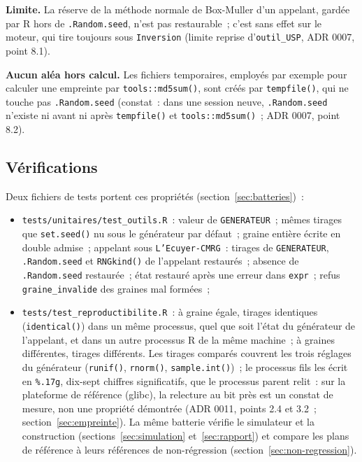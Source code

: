 \documentclass[a4paper,11pt]{article}
\newcommand{\code}[1]{\texttt{\small #1}}
\begin{document}
\medskip
\textbf{Limite.} La réserve de la méthode normale de Box-Muller d'un appelant,
gardée par R hors de \code{.Random.seed}, n'est pas restaurable~; c'est sans
effet sur le moteur, qui tire toujours sous \code{Inversion} (limite reprise
d'\code{outil\_USP}, ADR 0007, point 8.1).

\medskip
\textbf{Aucun aléa hors calcul.} Les fichiers temporaires, employés par
exemple pour calculer une empreinte par \code{tools::md5sum()}, sont créés par
\code{tempfile()}, qui ne touche pas \code{.Random.seed} (constat~: dans une
session neuve, \code{.Random.seed} n'existe ni avant ni après \code{tempfile()}
et \code{tools::md5sum()}~; ADR 0007, point 8.2).

\subsection{Vérifications}
\label{sec:verifications-alea}

Deux fichiers de tests portent ces propriétés (section~\ref{sec:batteries})~:

\begin{itemize}[leftmargin=*, itemsep=2pt]
  \item \code{tests/unitaires/test\_outils.R}~: valeur de \code{GENERATEUR}~;
    mêmes tirages que \code{set.seed()} nu sous le générateur par défaut~;
    graine entière écrite en double admise~; appelant sous
    \code{L'Ecuyer-CMRG}~: tirages de \code{GENERATEUR}, \code{.Random.seed}
    et \code{RNGkind()} de l'appelant restaurés~; absence de \code{.Random.seed}
    restaurée~; état restauré après une erreur dans \code{expr}~; refus
    \code{graine\_invalide} des graines mal formées~;
  \item \code{tests/test\_reproductibilite.R}~: à graine égale, tirages
    identiques (\code{identical()}) dans un même processus, quel que soit l'état
    du générateur de l'appelant, et dans un autre processus R de la même
    machine~; à graines différentes, tirages différents. Les tirages comparés
    couvrent les trois réglages du générateur (\code{runif()}, \code{rnorm()},
    \code{sample.int()})~; le processus fils les écrit en \code{\%.17g}, dix-sept
    chiffres significatifs, que le processus parent relit~: sur la plateforme
    de référence (glibc), la relecture au bit près est un constat de mesure,
    non une propriété démontrée (ADR 0011, points 2.4 et 3.2~;
    section~\ref{sec:empreinte}). La même batterie vérifie le simulateur
    et la construction (sections~\ref{sec:simulation} et~\ref{sec:rapport})
    et compare les plans de référence à leurs références de non-régression
    (section~\ref{sec:non-regression}).
\end{itemize}
\end{document}
